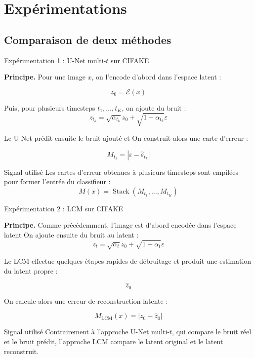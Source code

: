 \documentclass[10pt,aspectratio=169]{beamer}
\begin{document}

\section{Expérimentations}
\subsection{Comparaison de deux méthodes}
\begin{frame}{Expérimentation 1 : U-Net multi-\(t\) sur CIFAKE}


\textbf{Principe.}
Pour une image \(x\), on l’encode d’abord dans l’espace latent :

$$
    z_0=\mathcal{E}(x)
$$

Puis, pour plusieurs timesteps $t_1,\dots,t_K$, on ajoute du bruit :
$$
    z_{t_k}=\sqrt{\alpha_{t_k}}z_0+\sqrt{1-\alpha_{t_k}}\varepsilon
$$

Le U-Net prédit ensuite le bruit ajouté et On construit alors une carte d’erreur :

$$
    M_{t_k}=|\varepsilon-\hat{\varepsilon}_{t_k}|
$$

\vspace{0.2cm}

\begin{block}{Signal utilisé}
Les cartes d’erreur obtenues à plusieurs timesteps sont empilées pour former l’entrée du classifieur :
$$
    M(x)=\operatorname{Stack}(M_{t_1},\dots,M_{t_K})
$$
\end{block}

\end{frame}

\begin{frame}{Expérimentation 2 : LCM \citep{luo2023latentconsistencymodelssynthesizing} sur CIFAKE}


\textbf{Principe.}
Comme précédemment, l’image est d’abord encodée dans l’espace latent On ajoute ensuite du bruit au latent :
$$
    z_t=\sqrt{\alpha_t}z_0+\sqrt{1-\alpha_t}\varepsilon
$$

Le LCM effectue quelques étapes rapides de débruitage et produit une estimation du latent propre :

$$
    \hat{z}_0
$$

On calcule alors une erreur de reconstruction latente :

$$
    M_{\text{LCM}}(x)=|z_0-\hat{z}_0|
$$

\vspace{0.2cm}

\begin{block}{Signal utilisé}
Contrairement à l’approche U-Net multi-\(t\), qui compare le bruit réel et le bruit prédit, l’approche LCM compare le latent original et le latent reconstruit.
\end{block}
\end{frame}
\end{document}
